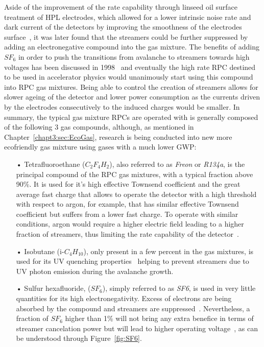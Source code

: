 	Aside of the improvement of the rate capability through linseed oil surface treatment of HPL electrodes, which allowed for a lower intrinsic noise rate and dark current of the detectors by improving the smoothness of the electrodes surface~\cite{ABBRESCIA1997OIL}, it was later found that the streamers could be further suppressed by adding an electronegative compound into the gas mixture. The benefits of adding $SF_6$ in order to push the transitions from avalanche to streamers towards high voltages has been discussed in 1998~\cite{CAMARRI98,ZEBALLOS98} and eventually the high rate RPC destined to be used in accelerator physics would unanimously start using this compound into RPC gas mixtures. Being able to control the creation of streamers allows for slower ageing of the detector and lower power consumption as the currents driven by the electrodes consecutively to the induced charges would be smaller. In summary, the typical gas mixture RPCs are operated with is generally composed of the following 3 gas compounds, although, as mentioned in Chapter~\ref{chapt3:sec:EcoGas}, research is being conducted into new more ecofriendly gas mixture using gases with a much lower \acl{GWP}:
	
	\begin{itemize}
		\item[•] Tetrafluoroethane ($C_2F_4H_2$), also referred to as \textit{Freon} or \textit{R134a}, is the principal compound of the RPC gas mixtures, with a typical fraction above 90\%. It is used for it's high effective Townsend coefficient and the great average fast charge that allows to operate the detector with a high threshold with respect to argon, for example, that has similar effective Townsend coefficient but suffers from a lower fast charge. To operate with similar conditions, argon would require a higher electric field leading to a higher fraction of streamers, thus limiting the rate capability of the detector~\cite{ABBRESCIA1997,ABBRESCIA1997PERF}.
		\item[•] Isobutane (i-$C_4H_{10}$), only present in a few percent in the gas mixtures, is used for its UV quenching properties~\cite{BATTISTONI85} helping to prevent streamers due to UV photon emission during the avalanche growth.
		\item[•] Sulfur hexafluoride, ($SF_6$), simply referred to as \textit{SF6}, is used in very little quantities for its high electronegativity. Excess of electrons are being absorbed by the compound and streamers are suppressed~\cite{CAMARRI98,ZEBALLOS98}. Nevertheless, a fraction of $SF_6$ higher than 1\% will not bring any extra benefice in terms of streamer cancelation power but will lead to higher operating voltage~\cite{CAMARRI98}, as can be understood through Figure~\ref{fig:SF6}.
	\end{itemize}
	

